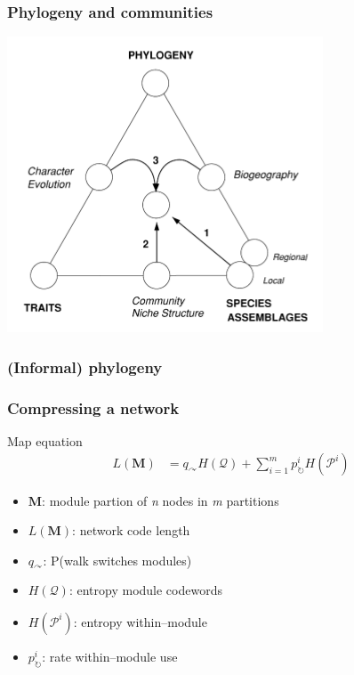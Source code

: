 \documentclass{beamer}
\begin{document}
\begin{frame}
  \frametitle{Phylogeny and communities}

  \begin{center}
    \includegraphics[height = 0.8\textheight, width = \textwidth,  keepaspectratio = true]{figure/webb}

    \tiny{}
  \end{center}
\end{frame}

\begin{frame}
  \frametitle{(Informal) phylogeny}
\end{frame}

\begin{frame}
  \frametitle{Compressing a network}

  \begin{block}{Map equation \tiny{}}
    \begin{align*}
      L(\textbf{M}) &= q_{\curvearrowright}H(\mathcal{Q}) + \sum^{m}_{i = 1} p^{i}_{\circlearrowright}H(\mathcal{P}^{i})
    \end{align*}

    \begin{itemize}
      \item \(\textbf{M}\): module partion of \textit{n} nodes in \textit{m} partitions
      \item \(L(\textbf{M})\): network code length 
      \item \(q_{\curvearrowright}\): P(walk switches modules)
      \item \(H(\mathcal{Q})\): entropy module codewords
      \item \(H(\mathcal{P}^{i})\): entropy within--module
      \item \(p^{i}_{\circlearrowright}\): rate within--module use
    \end{itemize}
  \end{block}
\end{frame}
\end{document}

